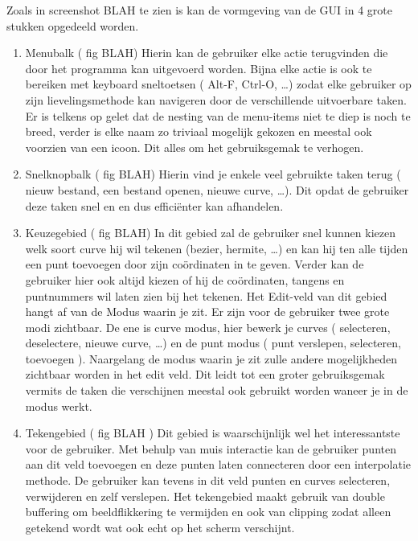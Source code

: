 \documentclass[a4paper,11pt,oneside, titlepage]{article}
\begin{document}
Zoals in screenshot BLAH te zien is kan de vormgeving van de GUI in 4 grote stukken opgedeeld 
worden.
\begin{enumerate}
\item Menubalk ( fig BLAH)
Hierin kan de gebruiker elke actie terugvinden die door het programma kan uitgevoerd worden.
Bijna elke actie is ook te bereiken met keyboard sneltoetsen ( Alt-F, Ctrl-O, \ldots ) zodat
elke gebruiker op zijn lievelingsmethode kan navigeren door de verschillende uitvoerbare taken.
Er is telkens op gelet dat de nesting van de menu-items niet te diep is noch te breed, verder
is elke naam zo triviaal mogelijk gekozen en meestal ook voorzien van een icoon. Dit alles
om het gebruiksgemak te verhogen.
\item Snelknopbalk ( fig BLAH)
Hierin vind je enkele veel gebruikte taken terug ( nieuw bestand, een bestand openen, 
nieuwe curve, \ldots ). Dit opdat de gebruiker deze taken snel en en dus effici\"enter kan
afhandelen.
\item Keuzegebied ( fig BLAH)
In dit gebied zal de gebruiker snel kunnen kiezen welk soort curve hij wil tekenen (bezier, 
hermite, \ldots ) en kan hij ten alle tijden een punt toevoegen door zijn co\"ordinaten in te
geven. Verder kan de gebruiker hier ook altijd kiezen of hij de co\"ordinaten, tangens en 
puntnummers wil laten zien bij het tekenen. \newline
Het Edit-veld van dit gebied hangt af van de Modus waarin je zit. Er zijn voor de gebruiker
twee grote modi zichtbaar. De ene is curve modus, hier bewerk je curves ( selecteren, 
deselectere, nieuwe curve, \ldots ) en de punt modus ( punt verslepen, selecteren, toevoegen ).
Naargelang de modus waarin je zit zulle andere mogelijkheden zichtbaar worden in het edit veld.
Dit leidt tot een groter gebruiksgemak vermits de taken die verschijnen meestal ook gebruikt
worden waneer je in de modus werkt.
\item Tekengebied ( fig BLAH )
Dit gebied is waarschijnlijk wel het interessantste voor de gebruiker. Met behulp van muis
interactie kan de gebruiker punten aan dit veld toevoegen en deze punten laten connecteren
door een interpolatie methode. De gebruiker kan tevens in dit veld punten en curves selecteren,
verwijderen en zelf verslepen. Het tekengebied maakt gebruik van double buffering om 
beeldflikkering te vermijden en ook van clipping zodat alleen getekend wordt wat ook echt
op het scherm verschijnt.
\end{enumerate}
\end{document}
